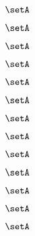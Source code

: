 \begin{forslides}
    \begin{equation}
        \label{eq:slides-translation-03}
        \setA
    \end{equation}

    \begin{equation}
        \label{eq:slides-translation-04}
        \setA
    \end{equation}

    \begin{equation}
        \label{eq:slides-translation-05}
        \setA
    \end{equation}

    \begin{equation}
        \label{eq:slides-translation-06}
        \setA
    \end{equation}

    \begin{equation}
        \label{eq:slides-translation-07}
        \setA
    \end{equation}

    \begin{equation}
        \label{eq:slides-translation-08}
        \setA
    \end{equation}

    \begin{equation}
        \label{eq:slides-translation-09}
        \setA
    \end{equation}
    
    \begin{equation}
        \label{eq:slides-translation-10}
        \setA
    \end{equation}

    \begin{equation}
        \label{eq:slides-translation-11}
        \setA
    \end{equation}

    \begin{equation}
        \label{eq:slides-translation-12}
        \setA
    \end{equation}

    \begin{equation}
        \label{eq:slides-translation-13}
        \setA
    \end{equation}

    \begin{equation}
        \label{eq:slides-translation-14}
        \setA
    \end{equation}

    \begin{equation}
        \label{eq:slides-translation-15}
        \setA
    \end{equation}


\end{forslides}

